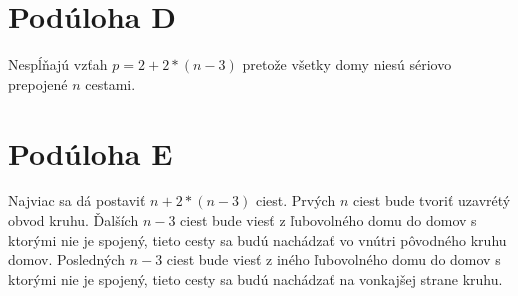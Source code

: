 \documentclass{article}
\begin{document}
\section{Podúloha D}

Nespĺňajú vzťah \(p = 2 + 2 * (n - 3)\) pretože všetky domy niesú sériovo prepojené \(n\) cestami.

\section{Podúloha E}

Najviac sa dá postaviť \(n + 2 * (n - 3)\) ciest. Prvých \(n\) ciest bude tvoriť uzavrétý obvod kruhu. Ďalších \(n - 3\) ciest bude viesť z ľubovolného domu do domov s ktorými nie je spojený, tieto cesty sa budú nachádzať vo vnútri pôvodného kruhu domov. Posledných \(n - 3\) ciest bude viesť z iného ľubovolného domu do domov s ktorými nie je spojený, tieto cesty sa budú nachádzať na vonkajšej strane kruhu.
\end{document}

